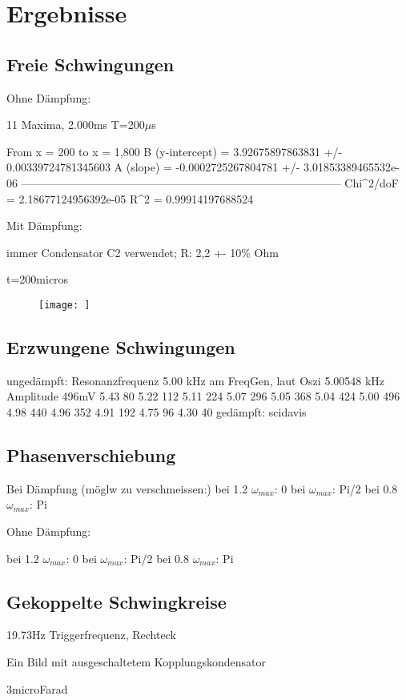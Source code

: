 \documentclass{article}
\begin{document}
\section{Ergebnisse}
\subsection{Freie Schwingungen}
Ohne Dämpfung:

11 Maxima, 2.000ms
T=200$\mu$s

From x = 200 to x = 1,800
B (y-intercept) = 3.92675897863831 +/- 0.00339724781345603
A (slope) = -0.0002725267804781 +/- 3.01853389465532e-06
--------------------------------------------------------------------------------------
Chi^2/doF = 2.18677124956392e-05
R^2 = 0.99914197688524

Mit Dämpfung:

immer Condensator C2 verwendet; R: 2,2 +- 10\% Ohm 

t=200micros

\begin{figure}
\texttt{[image: ]}
\end{figure}

\subsection{Erzwungene Schwingungen}
ungedämpft:
Resonanzfrequenz 5.00 kHz am FreqGen, laut Oszi 5.00548 kHz
Amplitude 496mV
5.43 80
5.22 112
5.11 224
5.07 296
5.05 368
5.04 424
5.00 496
4.98 440
4.96 	352
4.91 192
4.75 96
4.30 40
gedämpft:
scidavis

\subsection{Phasenverschiebung}
Bei Dämpfung (möglw zu verschmeissen:)
bei 1.2 $\omega_{max}$: 0
bei $\omega_{max}$: Pi/2
bei 0.8 $\omega_{max}$: Pi

Ohne Dämpfung:

bei 1.2 $\omega_{max}$: 0
bei $\omega_{max}$: Pi/2
bei 0.8 $\omega_{max}$: Pi


\subsection{Gekoppelte Schwingkreise}
19.73Hz Triggerfrequenz, Rechteck

Ein Bild mit ausgeschaltetem Kopplungskondensator

3microFarad
\end{document}
